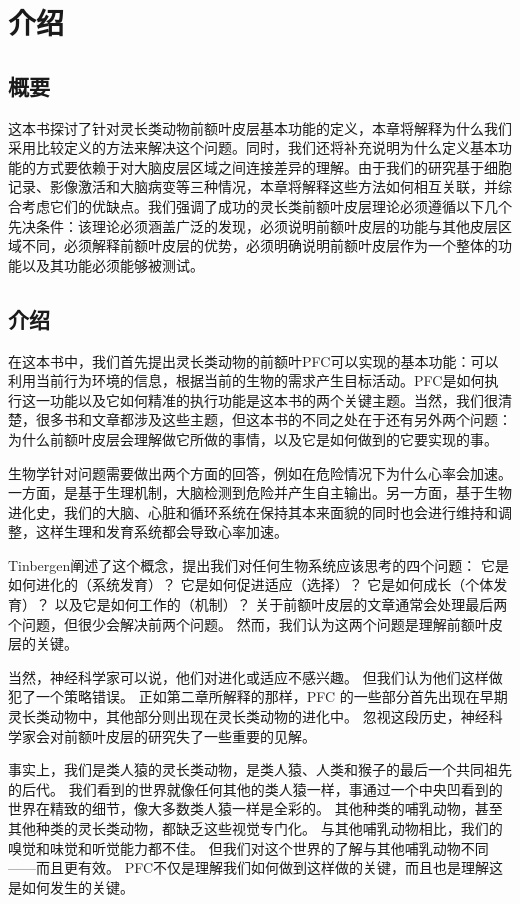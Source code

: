 

\chapter{介绍} \label{chap:chap1}
\section{概要}
这本书探讨了针对灵长类动物前额叶皮层基本功能的定义，本章将解释为什么我们采用比较定义的方法来解决这个问题。同时，我们还将补充说明为什么定义基本功能的方式要依赖于对大脑皮层区域之间连接差异的理解。由于我们的研究基于细胞记录、影像激活和大脑病变等三种情况，本章将解释这些方法如何相互关联，并综合考虑它们的优缺点。我们强调了成功的灵长类前额叶皮层理论必须遵循以下几个先决条件：该理论必须涵盖广泛的发现，必须说明前额叶皮层的功能与其他皮层区域不同，必须解释前额叶皮层的优势，必须明确说明前额叶皮层作为一个整体的功能以及其功能必须能够被测试。

\section{介绍}
在这本书中，我们首先提出灵长类动物的前额叶PFC可以实现的基本功能：可以利用当前行为环境的信息，根据当前的生物的需求产生目标活动。PFC是如何执行这一功能以及它如何精准的执行功能是这本书的两个关键主题。当然，我们很清楚，很多书和文章都涉及这些主题，但这本书的不同之处在于还有另外两个问题：为什么前额叶皮层会理解做它所做的事情，以及它是如何做到的它要实现的事。
\par 
生物学针对问题需要做出两个方面的回答，例如在危险情况下为什么心率会加速。一方面，是基于生理机制，大脑检测到危险并产生自主输出。另一方面，基于生物进化史，我们的大脑、心脏和循环系统在保持其本来面貌的同时也会进行维持和调整，这样生理和发育系统都会导致心率加速。

\par 
Tinbergen阐述了这个概念\cite{tinbergen2020study}，提出我们对任何生物系统应该思考的四个问题：
它是如何进化的（系统发育）？
它是如何促进适应（选择）？
它是如何成长（个体发育）？
以及它是如何工作的（机制）？
关于前额叶皮层的文章通常会处理最后两个问题，但很少会解决前两个问题。
然而，我们认为这两个问题是理解前额叶皮层的关键。
\par 
当然，神经科学家可以说，他们对进化或适应不感兴趣。
但我们认为他们这样做犯了一个策略错误。
正如第二章所解释的那样，PFC 的一些部分首先出现在早期灵长类动物中，其他部分则出现在灵长类动物的进化中。
忽视这段历史，神经科学家会对前额叶皮层的研究失了一些重要的见解。
\par 
事实上，我们是类人猿的灵长类动物，是类人猿、人类和猴子的最后一个共同祖先的后代。
我们看到的世界就像任何其他的类人猿一样，事通过一个中央凹看到的世界在精致的细节，像大多数类人猿一样是全彩的。
其他种类的哺乳动物，甚至其他种类的灵长类动物，都缺乏这些视觉专门化。
与其他哺乳动物相比，我们的嗅觉和味觉和听觉能力都不佳。
但我们对这个世界的了解与其他哺乳动物不同——而且更有效。
PFC不仅是理解我们如何做到这样做的关键，而且也是理解这是如何发生的关键。

